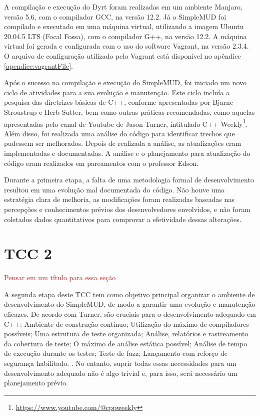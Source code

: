 A compilação e execução do Dyrt foram realizadas em um ambiente Manjaro, versão 5.6, com o compilador 
GCC, na versão 12.2. Já o SimpleMUD foi compilado e executado em uma máquina virtual, 
utilizando a imagem Ubuntu 20.04.5 LTS (Focal Fossa), com o compilador G++, na versão 12.2. A máquina 
virtual foi gerada e configurada com o uso do software Vagrant, na versão 2.3.4. O arquivo de 
configuração utilizado pelo Vagrant está disponível no apêndice \ref{apendice:vagrantFile}.

Após o sucesso na compilação e execução do SimpleMUD, foi iniciado um novo ciclo de atividades para a 
sua evolução e manutenção. Este ciclo incluía a pesquisa das diretrizes básicas de C++, conforme 
apresentadas por Bjarne Stroustrup e Herb Sutter, bem como outras práticas recomendadas, como aquelas 
apresentadas pelo canal de Youtube de Jason Turner, intitulado C++ Weekly\footnote{\url{https://www.youtube.com/@cppweekly}}. 
Além disso, foi realizada uma análise do código para identificar trechos que pudessem ser melhorados. 
Depois de realizada a análise, as atualizações eram implementadas e documentadas. A análise e o 
planejamento para atualização do código eram realizados em pareamentos com o professor Edson.

Durante a primeira etapa, a falta de uma metodologia formal de desenvolvimento resultou em uma evolução 
mal documentada do código. Não houve uma estratégia clara de melhoria, as modificações foram realizadas 
baseadas nas percepções e conhecimentos prévios dos desenvolvedores envolvidos, e não foram coletados 
dados quantitativos para comprovar a efetividade dessas alterações.

\section{TCC 2}
\label{section:tcc2}

\textcolor{red}{Pensar em um título para essa seção}

A segunda etapa deste TCC tem como objetivo principal organizar o ambiente de desenvolvimento do 
SimpleMUD, de modo a garantir uma evolução e manutenção eficazes. De acordo com Turner, são cruciais para 
o desenvolvimento adequado em C++: Ambiente de construção contínuo; Utilização do máximo de compiladores 
possíveis; Uma estrutura de teste organizada; Análise, relatórios e rastreamento da cobertura de teste; 
O máximo de análise estática possível; Análise de tempo de execução durante os testes; Teste de fuzz; 
Lançamento com reforço de segurança habilitado. \cite{turnerC++Weekly350}. No entanto, suprir todas essas necessidades para um desenvolvimento adequado não é algo trivial e, para isso, 
será necessário um planejamento prévio.

